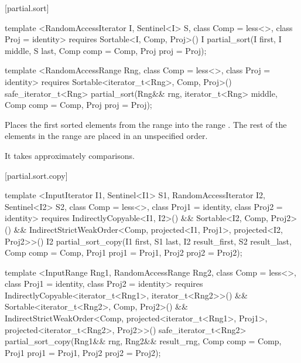 [partial.sort]{}

%
\begin{itemdecl}
template <RandomAccessIterator I, Sentinel<I> S, class Comp = less<>,
    class Proj = identity>
  requires Sortable<I, Comp, Proj>()
  I partial_sort(I first, I middle, S last, Comp comp = Comp{}, Proj proj = Proj{});

template <RandomAccessRange Rng, class Comp = less<>, class Proj = identity>
  requires Sortable<iterator_t<Rng>, Comp, Proj>()
  safe_iterator_t<Rng>
    partial_sort(Rng&& rng, iterator_t<Rng> middle, Comp comp = Comp{},
                 Proj proj = Proj{});
\end{itemdecl}

\begin{itemdescr}
\pnum
\effects
Places the first
sorted elements from the range
into the range
.
The rest of the elements in the range
are placed in an unspecified order.
%

\pnum
\complexity
It takes approximately
comparisons.
\end{itemdescr}

[partial.sort.copy]{}

%
\begin{itemdecl}
template <InputIterator I1, Sentinel<I1> S1, RandomAccessIterator I2, Sentinel<I2> S2,
    class Comp = less<>, class Proj1 = identity, class Proj2 = identity>
  requires IndirectlyCopyable<I1, I2>() && Sortable<I2, Comp, Proj2>() &&
      IndirectStrictWeakOrder<Comp, projected<I1, Proj1>, projected<I2, Proj2>>()
  I2
    partial_sort_copy(I1 first, S1 last, I2 result_first, S2 result_last,
                      Comp comp = Comp{}, Proj1 proj1 = Proj1{}, Proj2 proj2 = Proj2{});

template <InputRange Rng1, RandomAccessRange Rng2, class Comp = less<>,
    class Proj1 = identity, class Proj2 = identity>
  requires IndirectlyCopyable<iterator_t<Rng1>, iterator_t<Rng2>>() &&
      Sortable<iterator_t<Rng2>, Comp, Proj2>() &&
      IndirectStrictWeakOrder<Comp, projected<iterator_t<Rng1>, Proj1>,
        projected<iterator_t<Rng2>, Proj2>>()
  safe_iterator_t<Rng2>
    partial_sort_copy(Rng1&& rng, Rng2&& result_rng, Comp comp = Comp{},
                      Proj1 proj1 = Proj1{}, Proj2 proj2 = Proj2{});
\end{itemdecl}


